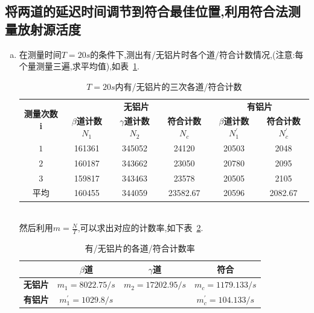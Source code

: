 \documentclass[a4paper]{article}
\begin{document}
\newpage
\subsection{将两道的延迟时间调节到符合最佳位置,利用符合法测量放射源活度}\label{sub:ctl}
\begin{enumerate}[a)]
\item 在测量时间$T=20s$的条件下,测出有/无铝片时各个道/符合计数情况,(注意:每个量测量三遍,求平均值),如表~\ref{tab:table1}.
\begin{table}[htp]
\caption{$T=20s$内有/无铝片的三次各道/符合计数}\label{tab:table1}
\begin{center}\begin{tabular}{|c|c|c|c|c|c|}%
    \toprule
	\hline
	\multirow{2}{*}{\textbf{测量次数i}} & \multicolumn{3}{c|}{\textbf{无铝片}} & \multicolumn{2}{c|}{\textbf{有铝片}}\\
	\cline{2-6}
	& \textbf{$\beta$道计数$N_1$} & \textbf{$\gamma$道计数$N_2$} & \textbf{符合计数$N_c$} & \textbf{$\beta$道计数$N^{\prime}_1$} & \textbf{符合计数$N^{\prime}_c$}\\ \hline \hline
	$1$ & 161361 & 345052 & 24120 & 20503 & 2048\\ \hline
	$2$ & 160187 & 343662 & 23050 & 20780 & 2095\\ \hline
	$3$ & 159817 & 343463 & 23578 & 20505 & 2105\\ \hline
	平均 & 160455 & 344059 & 23582.67 & 20596 & 2082.67\\ \hline
	\bottomrule
	\end{tabular}
\end{center}
\end{table}\\
然后利用$m=\frac{N}{T}$,可以求出对应的计数率,如下表~\ref{tab:table2}.
\begin{table}[htp]
\caption{有/无铝片的各道/符合计数率}\label{tab:table2}
\begin{center}\begin{tabular}{|c|c|c|c|}%
    \toprule
	\hline
	\diagbox & \textbf{$\beta$道} & \textbf{$\gamma$道} & \textbf{符合}\\ \hline \hline
	\textbf{无铝片} & $m_1=8022.75/s$ & $m_2=17202.95/s$ & $m_c=1179.133/s$ \\ \hline
	\textbf{有铝片} & $m^{\prime}_1=1029.8/s$ & \diagbox & $m^{\prime}_c=104.133/s$ \\ \hline
	\bottomrule
	\end{tabular}
\end{center}

\end{table}
\end{enumerate}
\end{document}
